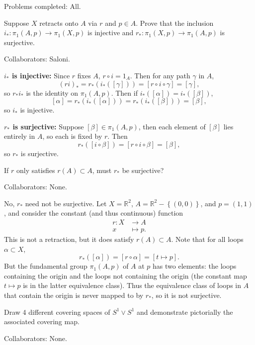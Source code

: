 \documentclass[twoside,10pt]{report}
\begin{document}

{\color{blue}Problems completed: All.}

\begin{exer}[]
	Suppose $X$ retracts onto $A$ via $r$ and $p \in A$. Prove that the inclusion $i_{*}:\pi_1(A,p)\to \pi_1(X,p)$ is injective and $r_{*}:\pi_1(X,p)\to \pi_1(A,p)$ is surjective.
\end{exer}
{\color{blue}Collaborators: Saloni.}

\textbf{$i_{*}$ is injective:} Since $r$ fixes $A$, $r\circ i=1_{A}$. Then for any path $\gamma$ in $A$,
\[
	(ri)_{*}=r_{*}(i_{*}([\gamma]))=[r\circ i \circ \gamma] = [\gamma],
\] so $r_{*}i_{*}$ is the identity on $\pi_{1}(A,p)$. Then if $i_{*}([\alpha])=i_{*}([\beta])$,
\[
	[\alpha] = r_{*}(i_{*}([\alpha]))=r_{*}(i_{*}([\beta]))=[\beta],
\] so $i_{*}$ is injective.

\textbf{$r_{*}$ is surjective:} Suppose $[\beta]\in \pi_1(A,p)$, then each element of $[\beta]$ lies entirely in $A$, so each is fixed by $r$. Then
\[
	r_{*}([i\circ \beta]) = [r\circ i \circ \beta]=[\beta],
\] so $r_{*}$ is surjective.

\newpage
\begin{exer}[]
	If $r$ only satisfies $r(A)\subset A$, must $r_*$ be surjective?
\end{exer}
{\color{blue}Collaborators: None.}

No, $r_{*}$ need not be surjective. Let $X=\mathbb{R}^2$, $A=\mathbb{R}^{2}-\left\{ (0,0) \right\}$, and $p=(1,1)$, and consider the constant (and thus continuous) function
\begin{align*}
	r:X&\to A\\
	x&\mapsto p.
\end{align*}
This is not a retraction, but it does satisfy $r(A)\subset A$. Note that for all loops $\alpha \subset X$,
\[
	r_{*}([\alpha]) = [r \circ \alpha] = [ t\mapsto p].
\] 
But the fundamental group $\pi_1(A,p)$ of $A$ at $p$ has two elements: the loops containing the origin and the loops not containing the origin (the constant map $t\mapsto p$ is in the latter equivalence class). Thus the equivalence class of loops in $A$ that contain the origin is never mapped to by $r_{*}$, so it is not surjective.

\newpage
\begin{exer}[]
Draw 4 different covering spaces of $S^1\vee S^1$ and demonstrate pictorially the associated covering map.
\end{exer}
{\color{blue}Collaborators: None.}
\end{document}
